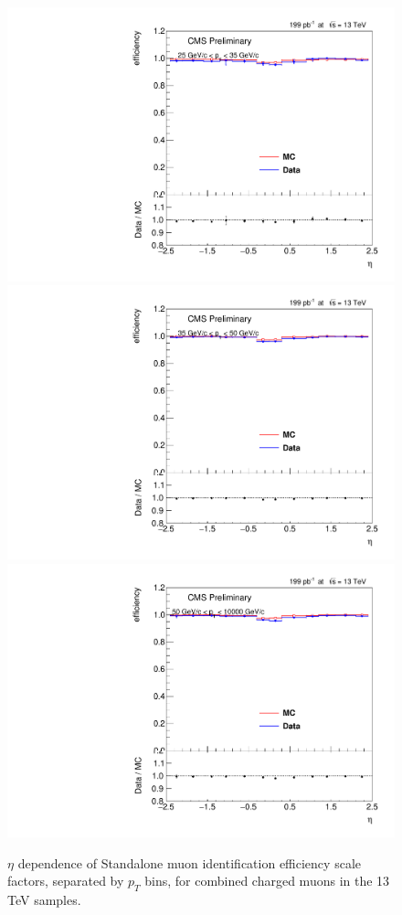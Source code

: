 \begin{figure}
\centering
\includegraphics[width=0.48\linewidth]{plots/efficiency/13_zmmsta_combined/PtBins_eta_pt0.pdf}
\includegraphics[width=0.48\linewidth]{plots/efficiency/13_zmmsta_combined/PtBins_eta_pt1.pdf}
\includegraphics[width=0.48\linewidth]{plots/efficiency/13_zmmsta_combined/PtBins_eta_pt2.pdf}
\caption{$\eta$ dependence of Standalone muon identification efficiency scale factors, separated by $p_T$ bins, for combined charged muons in the 13 TeV samples.}
\label{fig:Eff:mu:13:Sta:com}
\end{figure}
